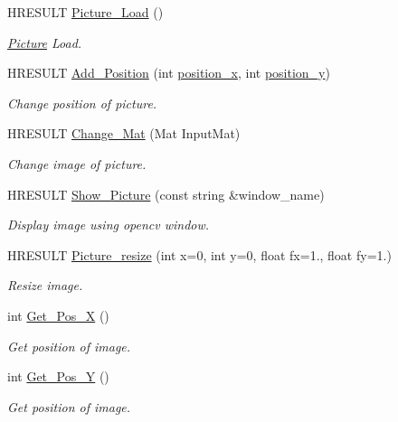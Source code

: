 \begin{DoxyCompactItemize}
H\+R\+E\+S\+U\+LT \hyperlink{class_picture_1_1_picture_a5e5b20e0f0c261e3338ec23bc7c58252}{Picture\+\_\+\+Load} ()
\begin{DoxyCompactList}\small\item\em \hyperlink{class_picture_1_1_picture}{Picture} Load. \end{DoxyCompactList}\item 
H\+R\+E\+S\+U\+LT \hyperlink{class_picture_1_1_picture_aef9d41f3c409a2c3cf804ee51222ec8b}{Add\+\_\+\+Position} (int \hyperlink{group___the_gabc618c40aa01ec5878903a3170e1867a}{position\+\_\+x}, int \hyperlink{group___the_gaad6be8d081af96530b6de3094b979af9}{position\+\_\+y})
\begin{DoxyCompactList}\small\item\em Change position of picture. \end{DoxyCompactList}\item 
H\+R\+E\+S\+U\+LT \hyperlink{class_picture_1_1_picture_ac9fa647455f925a5a429d37448cdb4bd}{Change\+\_\+\+Mat} (Mat Input\+Mat)
\begin{DoxyCompactList}\small\item\em Change image of picture. \end{DoxyCompactList}\item 
H\+R\+E\+S\+U\+LT \hyperlink{class_picture_1_1_picture_a08dde05c39be67ec6d6c279314356e07}{Show\+\_\+\+Picture} (const string \&window\+\_\+name)
\begin{DoxyCompactList}\small\item\em Display image using opencv window. \end{DoxyCompactList}\item 
H\+R\+E\+S\+U\+LT \hyperlink{class_picture_1_1_picture_a4044830d730f7c5f2039652f830b1bbb}{Picture\+\_\+resize} (int x=0, int y=0, float fx=1., float fy=1.)
\begin{DoxyCompactList}\small\item\em Resize image. \end{DoxyCompactList}\item 
int \hyperlink{class_picture_1_1_picture_a827efae2ce4832dbbdc8877ac3c175b8}{Get\+\_\+\+Pos\+\_\+X} ()
\begin{DoxyCompactList}\small\item\em Get position of image. \end{DoxyCompactList}\item 
int \hyperlink{class_picture_1_1_picture_a370ddd3fba418dbaeac72f649feec7a7}{Get\+\_\+\+Pos\+\_\+Y} ()
\begin{DoxyCompactList}\small\item\em Get position of image. \end{DoxyCompactList}\item 

\end{DoxyCompactItemize}
